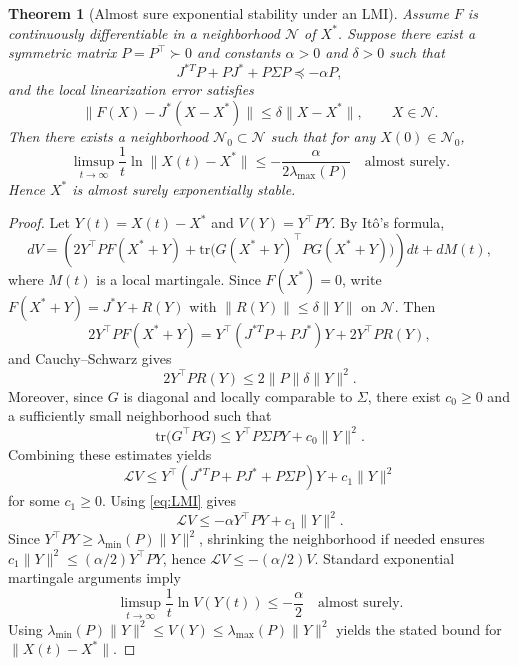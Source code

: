 \documentclass[11pt]{article}
\numberwithin{equation}{section}
\newtheorem{theorem}{Theorem}[section]
\begin{document}
\begin{theorem}[Almost sure exponential stability under an LMI]\label{thm:LMI_stab}
Assume $F$ is continuously differentiable in a neighborhood $\mathcal{N}$ of $X^*$. Suppose there exist a symmetric matrix $P=P^\top\succ 0$ and constants $\alpha>0$ and $\delta>0$ such that
\begin{equation}\label{eq:LMI}
J^{*T}P+PJ^*+P\Sigma P \preceq -\alpha P,
\end{equation}
and the local linearization error satisfies
\begin{equation}\label{eq:lin_error}
\lVert F(X)-J^*(X-X^*)\rVert\le \delta\lVert X-X^*\rVert,\qquad X\in\mathcal{N}.
\end{equation}
Then there exists a neighborhood $\mathcal{N}_0\subset\mathcal{N}$ such that for any $X(0)\in\mathcal{N}_0$,
\[
\limsup_{t\to\infty}\frac{1}{t}\ln\lVert X(t)-X^*\rVert
\le -\frac{\alpha}{2\lambda_{\max}(P)}
\quad\text{almost surely}.
\]
Hence $X^*$ is almost surely exponentially stable.
\end{theorem}

\begin{proof}
Let $Y(t)=X(t)-X^*$ and $V(Y)=Y^\top PY$. By It\^o's formula,
\begin{equation}\label{eq:Ito_quad}
dV
=\left(2Y^\top PF(X^*+Y)+\mathrm{tr}\big(G(X^*+Y)^\top PG(X^*+Y)\big)\right)dt+dM(t),
\end{equation}
where $M(t)$ is a local martingale. Since $F(X^*)=0$, write $F(X^*+Y)=J^*Y+R(Y)$ with $\lVert R(Y)\rVert\le \delta\lVert Y\rVert$ on $\mathcal{N}$. Then
\[
2Y^\top PF(X^*+Y)=Y^\top(J^{*T}P+PJ^*)Y+2Y^\top PR(Y),
\]
and Cauchy--Schwarz gives
\[
2Y^\top PR(Y)\le 2\lVert P\rVert \delta \lVert Y\rVert^2.
\]
Moreover, since $G$ is diagonal and locally comparable to $\Sigma$, there exist $c_0\ge 0$ and a sufficiently small neighborhood such that
\[
\mathrm{tr}\big(G^\top PG\big)\le Y^\top P\Sigma P Y+c_0\lVert Y\rVert^2.
\]
Combining these estimates yields
\[
\mathcal{L}V \le Y^\top(J^{*T}P+PJ^*+P\Sigma P)Y+c_1\lVert Y\rVert^2
\]
for some $c_1\ge 0$. Using \eqref{eq:LMI} gives
\[
\mathcal{L}V \le -\alpha Y^\top PY+c_1\lVert Y\rVert^2.
\]
Since $Y^\top PY\ge \lambda_{\min}(P)\lVert Y\rVert^2$, shrinking the neighborhood if needed ensures
$c_1\lVert Y\rVert^2\le (\alpha/2)Y^\top PY$, hence $\mathcal{L}V\le -(\alpha/2)V$. Standard exponential martingale arguments imply
\[
\limsup_{t\to\infty}\frac{1}{t}\ln V(Y(t))\le -\frac{\alpha}{2}\quad\text{almost surely}.
\]
Using $\lambda_{\min}(P)\lVert Y\rVert^2\le V(Y)\le \lambda_{\max}(P)\lVert Y\rVert^2$ yields the stated bound for $\lVert X(t)-X^*\rVert$.
\end{proof}
\end{document}

